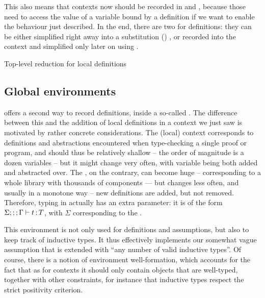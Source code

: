 This also means that contexts now should be recorded in
 and , because those need to access the value of a
variable bound by a definition if we want to enable the behaviour just described.
In the end, there are two  for definitions: they can be either
simplified right away into a substitution ()%
,
or recorded into the context and simplified only later on
using .

\begin{marginfigure}
  \ContinuedFloat
  \caption{Top-level reduction for local definitions}
\end{marginfigure}

\subsection{Global environments}

 offers a second way to record definitions, inside a so-called
.
The difference between this and the addition of local definitions in a context we
just saw is motivated by rather concrete considerations.
The (local) context corresponds to definitions and abstractions
encountered when type-checking a single proof or program, and should thus be relatively shallow
– the order of magnitude is a dozen variables – but it might change very often, with variable
being both added and abstracted over.
The , on the contrary, can become huge –
corresponding to a whole library with thousands of components — but changes less often, and
usually in a monotone way – new definitions are added, but not removed.
Therefore, typing in  actually has an extra parameter: it is of the form
$\Sigma ;;; \Gamma \vdash t \operatorname{\mathrel{:}} T$, with $\Sigma$ corresponding to the .

This environment is not only used for definitions and assumptions,
but also to keep track of inductive types.
It thus effectively implements our somewhat vague assumption that
 is extended with “any number of valid inductive types”. Of course, there is a notion
of environment well-formation, which accounts for the fact that as for contexts it should
only contain objects that are well-typed, together with other constraints, for instance
that inductive types respect the strict positivity criterion.

